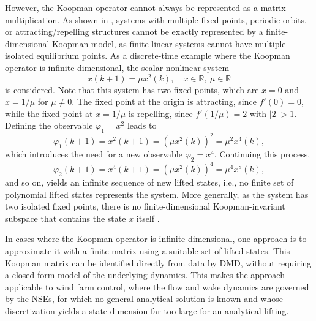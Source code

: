 However, the Koopman operator cannot always be represented as a matrix multiplication. As shown in \cite{brunton2016koopman}, systems with multiple fixed points, periodic orbits, or attracting/repelling structures cannot be exactly represented by a finite-dimensional Koopman model, as finite  linear systems cannot have multiple isolated equilibrium points.
As a discrete-time example where the Koopman operator is infinite-dimensional,  the scalar nonlinear system
\begin{equation}
    x(k+1) = \mu x^2(k), \quad x \in \mathbb{R}, \ \mu \in \mathbb{R}
\end{equation}
is considered. Note that this system has two fixed points, which are $x=0$ and $x=1/\mu$ for $\mu \neq 0$. The fixed point at the origin is attracting, since $f'(0)=0$, 
while the fixed point at $x=1/\mu$ is repelling, since $f'(1/\mu)=2$ with $|2|>1$. Defining the observable \( \varphi_1 = x^2 \) leads to
\begin{equation}
    \varphi_1(k+1) = x^2(k+1) = (\mu x^2(k))^2 = \mu^2 x^4(k),
\end{equation}
which introduces the need for a new observable \( \varphi_2 = x^4 \). Continuing this process,
\begin{equation}
    \varphi_2(k+1) = x^4(k+1) = (\mu x^2(k))^4 = \mu^4 x^8(k),
\end{equation}
and so on, yields an infinite sequence of new lifted states, i.e., no finite set of polynomial lifted states represents the system. More generally, as the system has two isolated fixed points, there is no finite-dimensional Koopman-invariant subspace that contains the state $x$ itself \cite{brunton2016koopman}.

In cases where the Koopman operator is infinite-dimensional, one approach is to approximate it with a finite matrix using a suitable set of lifted states. This Koopman matrix can be identified directly from data by DMD, without requiring a closed-form model of the underlying dynamics. This makes the approach applicable to wind farm control, where the flow and wake dynamics are governed by the NSEs, for which no general analytical solution is known and whose discretization yields a state dimension far too large for an analytical lifting.


